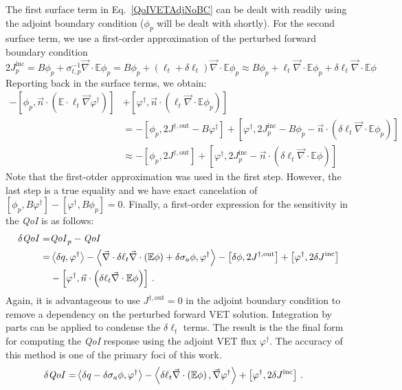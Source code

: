 \documentclass[12pt]{report}
\newcommand{\bra}{\left\langle}
\newcommand{\ket}{\right\rangle}
\newcommand{\sbra}{\left[}
\newcommand{\sket}{\right]}
\renewcommand{\div}{\vec{\nabla} \cdot}
\newcommand{\grad}{\vec{\nabla}}
\newcommand{\vefadj}{\varphi^\dag}
\newcommand{\vn}{\vec{n}}
\newcommand{\Edd}{\mathbb{E}}
\newcommand{\siga}{\sigma_a}
\newcommand{\isigt}{\ell_t}
\newcommand{\scalSource}{q}
\newcommand{\qoi}{{\it QoI}\xspace}
\begin{document}
The first surface term in Eq.~\eqref{QoIVETAdjNoBC} 
can be dealt with readily using the adjoint boundary condition ($\phi_p$ will be dealt with shortly). For the second surface term, we use a first-order approximation of the perturbed forward boundary condition  
\[
2 J_p^{\text{inc}} = B \phi_p + \sigma_{t,p}^{-1}\div \Edd \phi_p
= B \phi_p + (\isigt + \delta \isigt) \div \Edd \phi_p
\approx B \phi_p + \isigt  \div \Edd \phi_p + \delta \isigt  \div \Edd \phi
\]
Reporting back in the surface terms, we obtain:
\begin{equation}
\begin{split}
 - \sbra \phi_p, \vn \cdot \left( \Edd \cdot \isigt \grad \vefadj \right) \sket  &+ \sbra \vefadj, \vn \cdot \left(  \isigt \div \Edd \phi_p \right) \sket \\
&=- \sbra \phi_p, 2J^{\dag,\text{out}} - B \vefadj \sket 
+ \sbra \vefadj, 2 J_p^{\text{inc}} - B \phi_p - \vn \cdot \left( \delta \isigt \div \Edd \phi_p \right) \sket \\
&\approx- \sbra \phi_p, 2J^{\dag,\text{out}} \sket + \sbra \vefadj, 2 J_p^{\text{inc}} - \vn \cdot \left( \delta \isigt \div \Edd \phi \right) \sket  
\end{split}
\end{equation}
Note that the first-otder approximation was used in the first step. However, the last step is a true equality and we have exact cancelation of $\sbra \phi_p,B \vefadj \sket - \sbra \vefadj , B\phi_p\sket=0$. Finally, a first-order expression for the sensitivity in the \qoi is as follows:
\begin{equation}
\label{QoIVETAdjlong}
\begin{split}
\delta \qoi =& \qoi_p - \qoi \\ 
=& \bra \delta \scalSource , \vefadj \ket - \bra \div \delta \isigt \div \left( \Edd \phi \right)  + \delta \siga \phi, \vefadj \ket 
- \sbra \delta \phi, 2J^{\dag,\text{out}} \sket + \sbra \vefadj, 2 \delta J^{\text{inc}} \sket \\
& - \sbra \vefadj, \vn \cdot \left( \delta \isigt \div \Edd \phi \right) \sket \,.
\end{split}
\end{equation}
Again, it is advantageous to use $J^{\dag,\text{out}}=0$ in the adjoint boundary condition to remove a dependency on the 
perturbed forward VET solution. Integration by parts can be applied to condense the $\delta \isigt$ terms. The result is the the final form for computing the \qoi response using the adjoint VET flux $\vefadj$. The accuracy of this method is one of the primary foci of this work.
\begin{equation}
\label{VETsens}
\begin{split}
\delta \qoi =&  \bra \delta \scalSource - \delta \siga \phi, \vefadj \ket  - \bra \delta \isigt \div \left( \Edd \phi \right) , \grad \vefadj \ket
 + \sbra \vefadj, 2 \delta J^{\text{inc}} \sket \,.
\end{split}
\end{equation}
\end{document}
